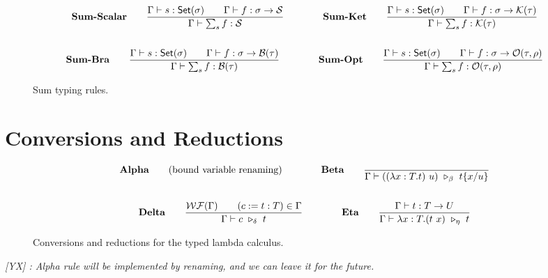 \documentclass{article}
\newcommand{\yx}[1]{\textit{\color{blue}[YX] : #1}}
\begin{document}
\begin{figure}[h]
    \begin{gather*}
        \textbf{Sum-Scalar} \qquad
        \frac{\Gamma \vdash s : \mathsf{Set}(\sigma) \qquad \Gamma \vdash f : \sigma \to \mathcal{S}}{\Gamma \vdash \sum_{s} f : \mathcal{S}} 
        \qquad \qquad
        \textbf{Sum-Ket} \qquad
        \frac{\Gamma \vdash s : \mathsf{Set}(\sigma) \qquad \Gamma \vdash f : \sigma \to \mathcal{K}(\tau)}{\Gamma \vdash \sum_{s} f : \mathcal{K}(\tau)} \\
        \\
        \textbf{Sum-Bra} \qquad
        \frac{\Gamma \vdash s : \mathsf{Set}(\sigma) \qquad \Gamma \vdash f : \sigma \to \mathcal{B}(\tau)}{\Gamma \vdash \sum_{s} f : \mathcal{B}(\tau)} 
        \qquad \qquad
        \textbf{Sum-Opt} \qquad
        \frac{\Gamma \vdash s : \mathsf{Set}(\sigma) \qquad \Gamma \vdash f : \sigma \to \mathcal{O}(\tau, \rho)}{\Gamma \vdash \sum_{s} f : \mathcal{O}(\tau, \rho)}
    \end{gather*}
    \caption{Sum typing rules.}
\end{figure}

\clearpage
\section{Conversions and Reductions}
\begin{figure}[h]
    \begin{gather*}
        \textbf{Alpha} \qquad \text{(bound variable renaming)}
        \qquad \qquad
        \textbf{Beta} \qquad
        \frac{}{\Gamma \vdash ((\lambda x:T.t)\ u)\ \reduce_\beta\ t\{x/u\}} \\
        \\
        \textbf{Delta} \qquad
        \frac{\WF(\Gamma) \qquad (c:=t:T) \in \Gamma}{\Gamma \vdash c\ \reduce_\delta\ t}
        \qquad \qquad
        \textbf{Eta} \qquad
        \frac{\Gamma\vdash t : T \to U}{\Gamma \vdash \lambda x : T . (t\ x)\ \reduce_\eta\ t}
    \end{gather*}
    \caption{Conversions and reductions for the typed lambda calculus.}
\end{figure}

\yx{Alpha rule will be implemented by renaming, and we can leave it for the future.}

\newenvironment{ruletable}[1]
{
    \begin{longtable}{cl}
    \caption{#1}\\
    \hline
    \textbf{Rule} & \textbf{Description} \\
    \hline
    \endfirsthead

    \hline
    \textbf{Rule} & \textbf{Description} \\
    \hline
    \endhead

    \hline
    \multicolumn{2}{r}{\textit{Continued on the next page}} \\
    \hline
    \endfoot

    \hline
    \endlastfoot
}
{
    \end{longtable}
}
\end{document}
